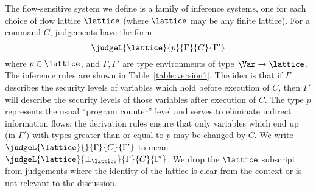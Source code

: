 \documentclass{sigplanconf}
\begin{document}
The flow-sensitive system we define is 
a family of inference systems, 
one for each choice of flow lattice $\lattice$ (where $\lattice$ may be
any finite lattice).
For a command $C$, judgements have the form
\[
        \judgeL{\lattice}{p}{\Gamma}{C}{\Gamma'}
\]
where $p \in \lattice$, and $\Gamma, \Gamma'$ are type environments of type $\Var \rightarrow \lattice$.
The inference rules are shown in Table~\ref{table:version1}.
The idea is that if $\Gamma$ describes the security levels of variables which hold 
before execution of $C$, then $\Gamma'$ will describe the security levels of those variables after execution of $C$.
The type $p$ represents the usual ``program counter'' level and serves to eliminate 
indirect information flows; the derivation rules ensure that only variables which end up
(in $\Gamma'$) with types greater than or equal to $p$ may be changed by $C$.
We write $\judgeL{\lattice}{}{\Gamma}{C}{\Gamma'}$ to mean $\judgeL{\lattice}{\perp_{\lattice}}{\Gamma}{C}{\Gamma'}$.
We drop the $\lattice$ subscript from judgements where the identity of the lattice is clear
from the context or is not relevant to the discussion.
\end{document}

